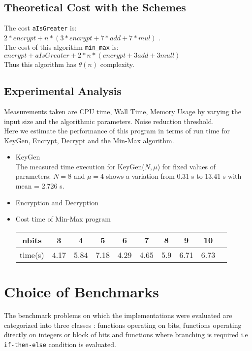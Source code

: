 \documentclass{acm_proc_article-sp}
\begin{document}
\subsection{Theoretical Cost with the Schemes}

The cost \texttt{aIsGreater} is:\\
 $2*encrypt+n*(3*encrypt+7*add+7*mul)$ .\\
The cost of this algorithm \texttt{min\_max} is:\\
$ encrypt+aIsGreater+2*n*(encrypt+3add+3mull)$\\
Thus this algorithm has $\theta(n)$ complexity. 

\subsection{Experimental Analysis}

Measurements taken are CPU time, Wall Time, Memory Usage by varying the input size  and the algorithmic parameters. Noise reduction threshold.\\
Here we estimate the performance of this program in terms of run time for KeyGen, Encrypt, Decrypt and the Min-Max algorithm.
\begin{itemize}

\item KeyGen\\
The measured time execution for KeyGen($N, \mu$)  for fixed values of parameters: $N=8$ and $\mu = 4$ shows a variation from 0.31 s to 13.41 s with mean = 2.726 s.\\
\item {Encryption and Decryption}\\


\item {Cost time of Min-Max program}\\
\begin{tabular}{|c|c|c|c|c|c|c|c|c|c|}
  \hline
  nbits  & 3 & 4 & 5 & 6 & 7 & 8 &  9  & 10 \\
  \hline
  time(s) & 4.17 & 5.84 & 7.18 & 4.29 & 4.65 & 5.9 & 6.71 & 6.73\\
  \hline
\end{tabular}
\end{itemize}
\section{Choice of Benchmarks}

The benchmark problems on which the implementations were evaluated are categorized into three classes : functions operating on bits, functions operating directly on integers or block of bits and functions where branching is required i.e \texttt{if-then-else} condition is evaluated. 
\end{document}
